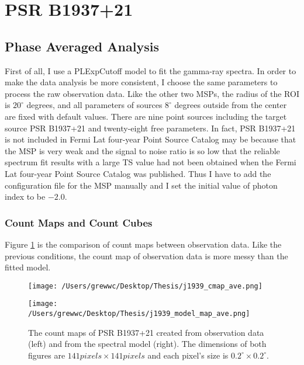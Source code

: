 \documentclass[12pt]{report}
\newcommand{\fgl}[0]{
  Fermi Lat four-year Point Source Catalog
}
\begin{document}
        \section{PSR B1937+21}
          \subsection{Phase Averaged Analysis}
            First of all, I use a PLExpCutoff model to fit the gamma-ray spectra. 
            In order to make the data analysis be more consistent, I choose the same parameters
            to process the raw observation data. Like the other two MSPs, the radius of the ROI 
            is $20^{\circ}$ degrees, and all parameters of sources $8^{\circ}$ degrees outside 
            from the center are fixed with default values. There are nine point sources including 
            the target source PSR B1937+21 and twenty-eight free parameters. In fact, PSR B1937+21
            is not included in \fgl{} may be because that the MSP is very weak and the signal to 
            noise ratio is so low that the reliable spectrum fit results with a large TS value 
            had not been obtained when the \fgl{} was published. Thus I have to add the 
            configuration file for the MSP manually and I set the initial value of photon index 
            to be $-2.0$.

            \subsubsection{Count Maps and Count Cubes}
              Figure \ref{fig: j1939_count_map_ave} is the comparison of count maps between 
              observation data. Like the previous conditions, the count map of observation data is 
              more messy than the fitted model. 

              \begin{figure}[!ht]
                \begin{center}
                \begin{minipage}{0.45\textwidth}
                  \begin{center} 
                    \texttt{[image: /Users/grewwc/Desktop/Thesis/j1939\_cmap\_ave.png]}
                  \end{center}
                \end{minipage}
                \begin{minipage}{0.45\textwidth}
                  \begin{center}
                    \texttt{[image: /Users/grewwc/Desktop/Thesis/j1939\_model\_map\_ave.png]}
                  \end{center}
                \end{minipage}
              \end{center}
              \caption{The count maps of PSR B1937+21 created from observation 
                  data (left) and from the spectral model (right). The dimensions
                  of both figures are $141 pixels \times 141 pixels$ and each pixel's size is
                  $0.2^{\circ}\times0.2^{\circ}$.}
                \label{fig: j1939_count_map_ave}
              \end{figure}
\end{document}
